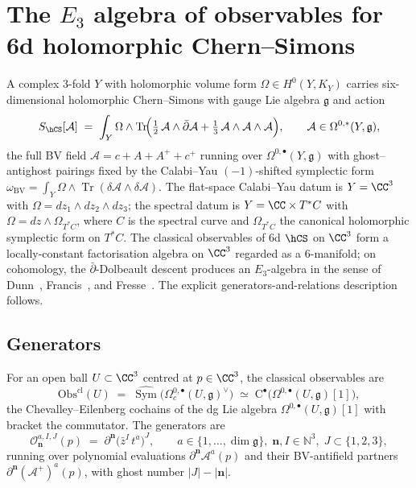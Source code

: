 \section{The $E_3$ algebra of observables for 6d holomorphic Chern--Simons}
\label{sec:E3-6d-hCS}

A complex $3$-fold $Y$ with holomorphic volume form $\Omega \in H^0(Y, K_Y)$
carries six-dimensional holomorphic Chern--Simons with gauge Lie algebra
$\mathfrak{g}$ and action
\[
S_{\hCS}[\mathcal{A}] \;=\; \int_Y \Omega \wedge \operatorname{Tr}\!\Bigl(\tfrac{1}{2}\,\mathcal{A} \wedge \bar\partial \mathcal{A} + \tfrac{1}{3}\,\mathcal{A}\wedge\mathcal{A}\wedge\mathcal{A}\Bigr),
\qquad \mathcal{A}\in \Omega^{0,*}(Y,\mathfrak{g}),
\]
the full BV field $\mathcal{A}=c + A + A^+ + c^+$ running over
$\Omega^{0,\bullet}(Y,\mathfrak{g})$ with ghost--antighost pairings fixed by
the Calabi--Yau $(-1)$-shifted symplectic form $\omega_{\mathrm{BV}} = \int_Y
\Omega \wedge \operatorname{Tr}(\delta\mathcal{A}\wedge \delta\mathcal{A})$.
The flat-space Calabi--Yau datum is $Y = \CC^3$ with $\Omega = dz_1\wedge dz_2\wedge dz_3$;
the spectral datum is $Y = \CC \times T^*C$ with $\Omega = dz \wedge \Omega_{T^*C}$,
where $C$ is the spectral curve and $\Omega_{T^*C}$ the canonical
holomorphic symplectic form on $T^*C$. The classical observables of 6d
$\hCS$ on $\CC^3$ form a locally-constant factorisation algebra on $\CC^3$
regarded as a $6$-manifold; on cohomology, the $\bar\partial$-Dolbeault
descent produces an $E_3$-algebra in the sense of
Dunn~\cite{Dunn88}, Francis~\cite{francis2013tangent}, and
Fresse~\cite{fresse-book}. The explicit generators-and-relations
description follows.

\subsection{Generators}
\label{subsec:E3-generators}

\begin{definition}
\label{def:E3-local-obs}
For an open ball $U\subset\CC^3$ centred at $p\in\CC^3$, the classical
observables are
\[
\mathrm{Obs}^{\mathrm{cl}}(U)
\;=\;
\widehat{\operatorname{Sym}}\bigl(\Omega^{0,\bullet}_c(U,\mathfrak{g})^\vee\bigr)
\;\simeq\;
\mathrm{C}^\bullet\bigl(\Omega^{0,\bullet}(U,\mathfrak{g})[1]\bigr),
\]
the Chevalley--Eilenberg cochains of the dg Lie algebra
$\Omega^{0,\bullet}(U,\mathfrak{g})[1]$ with bracket the commutator.
The generators are
\[
\mathcal{O}^{a,I,J}_{\mathbf{n}}(p)
\;=\;
\partial^{\mathbf{n}}\bigl(\bar z^I\,t^a\bigr)^{J},
\qquad
a\in\{1,\dots,\dim\mathfrak{g}\},\;
\mathbf{n},I\in\mathbb{N}^3,\;
J\subset\{1,2,3\},
\]
running over polynomial evaluations $\partial^{\mathbf{n}}\mathcal{A}^a(p)$ and
their BV-antifield partners
$\partial^{\mathbf{n}}(\mathcal{A}^+)^a(p)$, with ghost number $|J|-|\mathbf{n}|$.
\end{definition}

